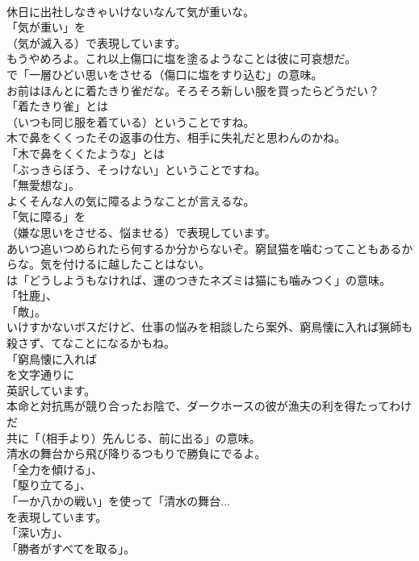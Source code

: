 \documentclass[8pt]{extreport}
\begin{document}
\begin{CJK}{UTF8}{min}
\\	休日に出社しなきゃいけないなんて気が重いな。 
\\	「気が重い」を 
\\	（気が滅入る）で表現しています。	
\\	もうやめろよ。これ以上傷口に塩を塗るようなことは彼に可哀想だ。 
\\	で「一層ひどい思いをさせる（傷口に塩をすり込む」の意味。	
\\	お前はほんとに着たきり雀だな。そろそろ新しい服を買ったらどうだい？ 
\\	「着たきり雀」とは 
\\	（いつも同じ服を着ている）ということですね。	
\\	木で鼻をくくったその返事の仕方、相手に失礼だと思わんのかね。 
\\	「木で鼻をくくたような」とは
\\	「ぶっきらぼう、そっけない」ということですね。
\\	「無愛想な」。	
\\	よくそんな人の気に障るようなことが言えるな。 
\\	「気に障る」を 
\\	（嫌な思いをさせる、悩ませる）で表現しています。	
\\	あいつ追いつめられたら何するか分からないぞ。窮鼠猫を噛むってこともあるからな。気を付けるに越したことはない。 
\\	は「どうしようもなければ、運のつきたネズミは猫にも噛みつく」の意味。
\\	「牡鹿」、
\\	「敵」。	
\\	いけすかないボスだけど、仕事の悩みを相談したら案外、窮鳥懐に入れば猟師も殺さず、てなことになるかもね。 
\\	「窮鳥懐に入れば 
\\	を文字通りに
\\	英訳しています。	
\\	本命と対抗馬が競り合ったお陰で、ダークホースの彼が漁夫の利を得たってわけだ 
\\	共に「（相手より）先んじる、前に出る」の意味。	
\\	清水の舞台から飛び降りるつもりで勝負にでるよ。 
\\	「全力を傾ける」、
\\	「駆り立てる」、
\\	「一か八かの戦い」を使って「清水の舞台... 
\\	を表現しています。
\\	「深い方」、
\\	「勝者がすべてを取る」。	

\end{CJK}
\end{document}
